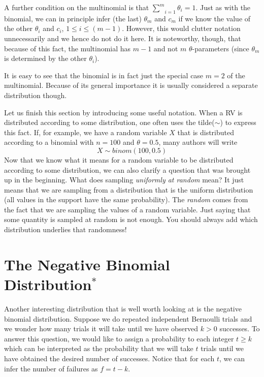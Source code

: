A further condition on the multinomial is that $ \underset{i=1}{\overset{m}{\sum}}\theta_{i} = 1 $. Just as with the binomial, we can
in principle infer (the last) $ \theta_{m} $ and $ c_{m} $ if we know the value of the other $ \theta_{i} $ and $ c_{i} $, $ 1 \leq i \leq (m-1) $. However, this would
clutter notation unnecessarily and we hence do not do it here. It is noteworthy, though, that because of this fact, the multinomial
has $ m-1 $ and not $ m $ $ \theta $-parameters (since $ \theta_{m} $ is determined by the other $ \theta_i $).

It is easy to see that the binomial is in fact just the special case
$m=2$ of the multinomial. Because of its general importance it is usually
considered a separate distribution though.

Let us finish this section by introducing some useful notation. When a RV is distributed according to some distribution, one often uses
the tilde($\sim$) to express this fact. If, for example, we have a random variable $ X $ that is distributed according to a binomial with $ n=100 $
and $ \theta = 0.5 $, many authors will write
$$ X \sim binom(100, 0.5) $$
Now that we know what it means for a random variable to be distributed according to some distribution, we can also clarify a question 
that was brought up in the beginning. What does sampling \textit{uniformly at random} mean? It just means that we are sampling from
a distribution that is the uniform distribution (all values in the support have the same probability). The \textit{random} comes from the fact that
we are sampling the values of a random variable. Just saying that some quantity is sampled at random is not enough. You should
always add which distribution underlies that randomness!


\section{The Negative Binomial Distribution$ ^{*} $}
Another interesting distribution that is well worth looking at is the negative binomial distribution. Suppose we do repeated independent Bernoulli trials and we wonder
how many trials it will take until we have observed $ k > 0 $ successes. To answer this question, we would like to assign a probability to each integer $ t \geq k $ which 
can be interpreted as the probability that we will take $ t $ trials until we have obtained the desired number of successes. Notice that for each $ t $, we can infer
the number of failures as $ f = t - k $.

